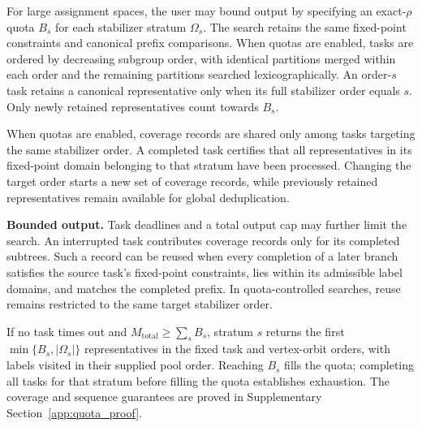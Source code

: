 \documentclass[a5paper, 10pt]{article}
\begin{document}
For large assignment spaces, the user may bound output by specifying an exact-$\rho$ quota $B_s$ for each stabilizer stratum $\Omega_s$. The search retains the same fixed-point constraints and canonical prefix comparisons. When quotas are enabled, tasks are ordered by decreasing subgroup order, with identical partitions merged within each order and the remaining partitions searched lexicographically. An order-$s$ task retains a canonical representative only when its full stabilizer order equals $s$. Only newly retained representatives count towards $B_s$.

When quotas are enabled, coverage records are shared only among tasks targeting the same stabilizer order. A completed task certifies that all representatives in its fixed-point domain belonging to that stratum have been processed. Changing the target order starts a new set of coverage records, while previously retained representatives remain available for global deduplication.

\medskip
\noindent\textbf{Bounded output.}
Task deadlines and a total output cap may further limit the search. An interrupted task contributes coverage records only for its completed subtrees. Such a record can be reused when every completion of a later branch satisfies the source task's fixed-point constraints, lies within its admissible label domains, and matches the completed prefix. In quota-controlled searches, reuse remains restricted to the same target stabilizer order.

If no task times out and $M_{\mathrm{total}}\geq\sum_sB_s$, stratum $s$ returns the first $\min\{B_s,|\Omega_s|\}$ representatives in the fixed task and vertex-orbit orders, with labels visited in their supplied pool order. Reaching $B_s$ fills the quota; completing all tasks for that stratum before filling the quota establishes exhaustion. The coverage and sequence guarantees are proved in Supplementary Section~\ref{app:quota_proof}.
\end{document}
